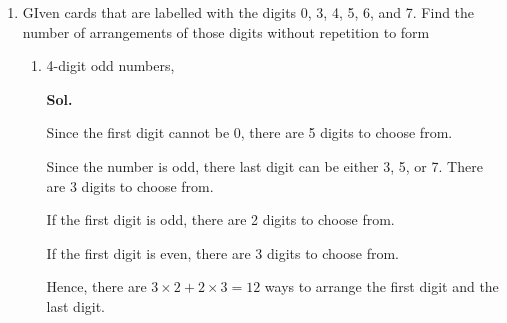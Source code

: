 \documentclass{report}
\newcommand\permtwo[2][^n]{{}_{#1}P_{#2}}
\newcommand{\sol}[1]{

      \noindent \textbf{Sol.}
}
\def\eos{\quad\hbox{\rlap{\hbox{\vrule depth 1.5pt height 2.6mm width 0.2mm \hskip 1mm \vrule height 2.6mm width 0.2mm}}{\vbox{\hrule height 0.2mm width 1.4mm \vskip 2.8mm \hrule depth 1.5pt height -0.35mm width 1.2mm}}}}
\begin{document}
\begin{multicols*}{2}
\begin{enumerate}
\begin{enumerate}
                        \item the magazines must be put together, \sol{}

                              Since the magazines must be put together, they can be treated as one book.

                              Since the magazines can be arranged in any order, there are $3! = 6$ ways to
                              arrange them.

                              There are $8! = 40\,320$ ways to arrange the 8 books.

                              Hence, there are $6 \times 40\,320 = 241\,920$ ways to arrange them. $\eos$

                        \item the magazines cannot be put together. \sol{}

                              First, arrange the 7 story books in $7! = 5\,040$ ways.

                              Then, arrange the 3 magazines in 8 slots in between the story books, the
                              beginning and the end of the bookshelf in $\permtwo[8]{3} = 336$ ways.

                              Hence, there are $5\,040 \times 336 = 1\,693\,440$ ways to arrange them. $\eos$
                  \end{enumerate}

            \item GIven cards that are labelled with the digits 0, 3, 4, 5, 6, and 7. Find the
                  number of arrangements of those digits without repetition to form
                  \begin{enumerate}
                        \item 4-digit odd numbers,
                              \sol{}

                              Since the first digit cannot be 0, there are 5 digits to choose from.

                              Since the number is odd, there last digit can be either 3, 5, or 7. There are 3
                              digits to choose from.

                              If the first digit is odd, there are 2 digits to choose from.

                              If the first digit is even, there are 3 digits to choose from.

                              Hence, there are $3 \times 2 + 2 \times 3 = 12$ ways to arrange the first digit
                              and the last digit.


\end{enumerate}
\end{enumerate}
\end{multicols*}
\end{document}
